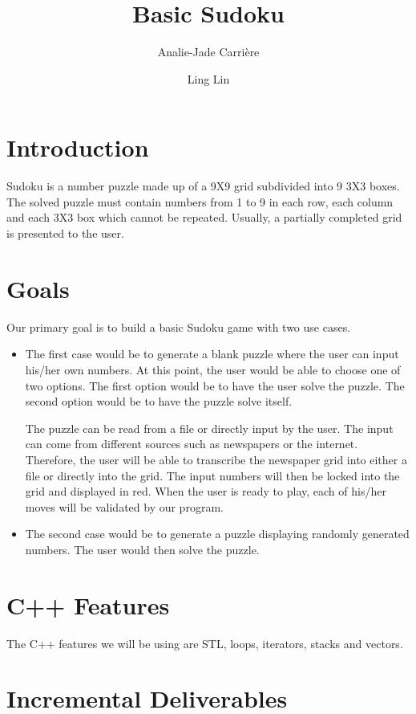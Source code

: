 \documentclass[12pt,letterpaper]{article}
\title{Basic Sudoku}
\author{Analie-Jade Carri\`ere \and Ling Lin}
\begin{document}
\maketitle

\section{Introduction}

Sudoku is a number puzzle made up of a 9X9 grid subdivided into 9 3X3
boxes. The solved puzzle must contain numbers from 1 to 9 in each row,
each column and each 3X3 box which cannot be repeated. Usually, a
partially completed grid is presented to the user.

\section{Goals}

Our primary goal is to build a basic Sudoku game with two use cases.

\begin{itemize}
\item
The first case would be to generate a blank puzzle where the user can
input his/her own numbers. At this point, the user would be able to
choose one of two options. The first option would be to have the user
solve the puzzle. The second option would be to have the puzzle solve
itself.

The puzzle can be read from a file or directly input by the user. The
input can come from different sources such as newspapers or the
internet. Therefore, the user will be able to transcribe the newspaper
grid into either a file or directly into the grid. The input numbers
will then be locked into the grid and displayed in red. When the user
is ready to play, each of his/her moves will be validated by our
program.

\item
The second case would be to generate a puzzle displaying randomly
generated numbers. The user would then solve the puzzle.
\end{itemize}


\section{C++ Features}

The C++ features we will be using are STL, loops, iterators, stacks
and vectors.

 
\section{Incremental Deliverables}
\end{document}
